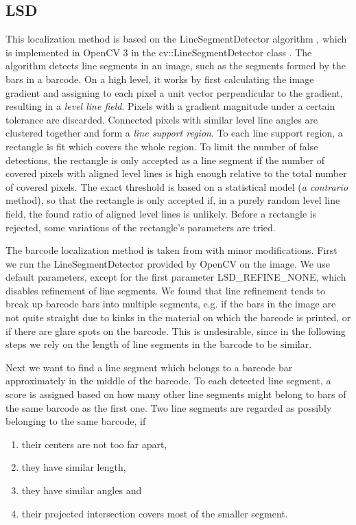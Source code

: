 \subsection{LSD}\label{sec:LSD}
This localization method is based on the LineSegmentDetector algorithm
\cite{GromponevonGioi2012}, which is implemented in OpenCV 3 in the
cv::LineSegmentDetector class \cite{Bradski2017}. The algorithm detects line
segments in an image, such as the segments formed by the bars in a barcode.
On a high level, it works by first calculating the image gradient and assigning
to each pixel a unit vector perpendicular to the gradient, resulting in a
\emph{level line field}. Pixels with a gradient magnitude under a certain
tolerance are discarded. Connected pixels with similar level line angles are clustered
together and form a \emph{line support region}. To each line support region, a
rectangle is fit which covers the whole region. To limit the number of false
detections, the rectangle is only accepted as a line segment if the number of
covered pixels with aligned level lines is high enough relative to the total number of
covered pixels. The exact threshold is based on a statistical model (\emph{a
  contrario} method), so that the rectangle is only accepted if,
in a purely random level line field, the found ratio of aligned level lines is unlikely.
Before a rectangle is rejected, some variations of the rectangle's parameters
are tried.

The barcode localization method is taken from \citeauthor{Creusot2016} with minor modifications. First we run
the LineSegmentDetector provided by OpenCV on the image. We use default
parameters, except for the first parameter LSD\_REFINE\_NONE, which disables
refinement of line segments. We found that line refinement tends to break up
barcode bars into multiple segments, e.g. if the bars in the image are not quite
straight due to kinks in the material on which the barcode is printed, or if
there are glare spots on the barcode. This is undesirable, since in the
following steps we rely on the length of line segments in the barcode to be similar.

Next we want to find a line segment which belongs to a barcode bar approximately
in the middle of the barcode. To each detected line segment, a score is assigned
based on how many other line segments might belong to bars of the same barcode as the first
one. Two line segments are regarded as possibly belonging to the same barcode, if
\begin{enumerate}
\item their centers are not too far apart,
\item they have similar length,
\item they have similar angles and
\item their projected intersection covers most of the smaller segment.
\end{enumerate}

